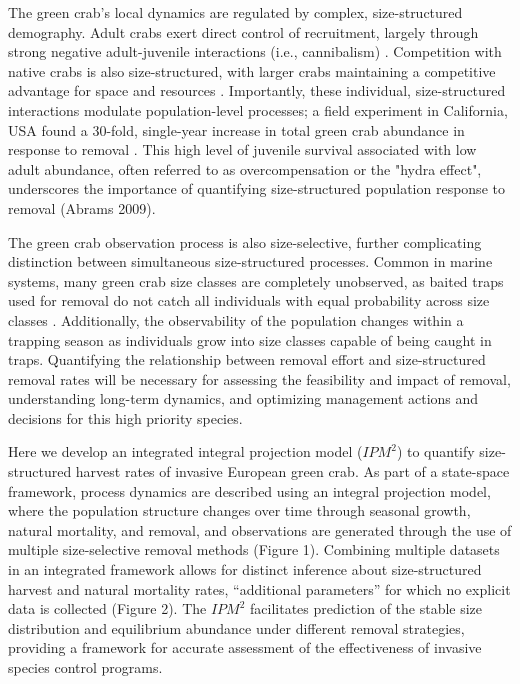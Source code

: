 \documentclass{article}
\begin{document}
The green crab’s local dynamics are regulated by complex, size-structured demography. Adult crabs exert direct control of recruitment, largely through strong negative adult-juvenile interactions (i.e., cannibalism) \parencite{grosholz2021stage, romano2017cannibalism}. Competition with native crabs is also size-structured, with larger crabs maintaining a competitive advantage for space and resources \parencite{mcdonald2001competitive, jensen2007biotic}. Importantly, these individual, size-structured interactions modulate population-level processes; a field experiment in California, USA found a 30-fold, single-year increase in total green crab abundance in response to removal \parencite{grosholz2021stage}. This high level of juvenile survival associated with low adult abundance, often referred to as overcompensation or the "hydra effect", underscores the importance of quantifying size-structured population response to removal (Abrams 2009). 

The green crab observation process is also size-selective, further complicating distinction between simultaneous size-structured processes. Common in marine systems, many green crab size classes are completely unobserved, as baited traps used for removal do not catch all individuals with equal probability across size classes \parencite{jorgensen2009size}. Additionally, the observability of the population changes within a trapping season as individuals grow into size classes capable of being caught in traps. Quantifying the relationship between removal effort and size-structured removal rates will be necessary for assessing the feasibility and impact of removal, understanding long-term dynamics, and optimizing management actions and decisions for this high priority species. 

Here we develop an integrated integral projection model ($IPM^2$) to quantify size-structured harvest rates of invasive European green crab. As part of a state-space framework, process dynamics are described using an integral projection model, where the population structure changes over time through seasonal growth, natural mortality, and removal, and observations are generated through the use of multiple size-selective removal methods (Figure 1). Combining multiple datasets in an integrated framework allows for distinct inference about size-structured harvest and natural mortality rates, “additional parameters” for which no explicit data is collected (Figure 2). The $IPM^2$ facilitates prediction of the stable size distribution and equilibrium abundance under different removal strategies, providing a framework for accurate assessment of the effectiveness of invasive species control programs.
\end{document}
